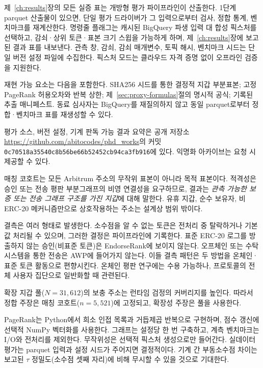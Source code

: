 
제~\ref{ch:results}장의 모든 실증 표는 개방형 평가 파이프라인이 산출한다. 1단계 parquet 산출물이 있으면, 단일 평가 드라이버가 그 입력으로부터 검사, 정합 통계, 벤치마크를 재계산한다. 명령줄 플래그는 캐시된 BigQuery 파생 입력 대 합성 픽스처를 선택하고, 감쇠·상위 토큰·표본 크기 스윕을 가능하게 하며, 제~\ref{ch:results}장에 보고된 결과 표를 내보낸다. 관측 창, 감쇠, 감쇠 매개변수, 토픽 해시, 벤치마크 시드는 단일 버전 설정 파일에 수집한다. 픽스처 모드는 클라우드 자격 증명 없이 오프라인 검증을 지원한다.

재현 가능 요소는 다음을 포함한다. SHA256 시드를 통한 결정적 지갑 부분표본; 고정 PageRank 허용오차와 반복 상한; 제~\ref{sec:proxy-formulas}절의 명시적 공식; 기록된 추출 매니페스트. 동료 심사자는 BigQuery를 재질의하지 않고 동일 parquet로부터 정합·벤치마크 표를 재생성할 수 있다.

평가 소스, 버전 설정, 기계 판독 가능 결과 요약은 공개 저장소 \url{https://github.com/abitocodes/phd_works}의 커밋 \texttt{0c70518a35540c8b56be66b52452cb94ca3fb916}에 있다. 익명화 아카이브는 요청 시 제공할 수 있다.


매칭 코호트는 모든 Arbitrum 주소의 무작위 표본이 아니라 목적 표본이다. 적격성은 승인 또는 전송 평판 부분그래프의 비영 연결성을 요구하므로, 결과는 \emph{관측 가능한 보증 또는 전송 그래프 구조를 가진 지갑}에 대해 말한다. 유휴 지갑, 순수 보유자, 비 ERC-20 메커니즘만으로 상호작용하는 주소는 설계상 범위 밖이다.

결측은 여러 형태로 발생한다. 소수점을 알 수 없는 토큰은 전처리 중 탈락하거나 기본값 처리될 수 있으며, 그러한 결정은 파이프라인에 기록한다. 표준 ERC-20 로그를 방출하지 않는 승인(비표준 토큰)은 EndorseRank에 보이지 않는다. 오프체인 또는 수탁 시스템을 통한 전송은 AWP에 들어가지 않는다. 이들 결측 패턴은 두 방법을 온체인·표준 토큰 활동으로 편향시킨다. 온체인 평판 연구에는 수용 가능하나, 프로토콜의 전체 사용자 집단으로 일반화할 때 관련된다.

확장 지갑 풀($N=31{,}612$)의 보충 주소는 런타임 검정의 커버리지를 높인다. 따라서 정합 주장은 매칭 코호트($n=5{,}521$)에 고정되고, 확장성 주장은 풀을 사용한다.


PageRank는 Python에서 희소 인접 목록과 거듭제곱 반복으로 구현하며, 점수 갱신에 선택적 NumPy 벡터화를 사용한다. 그래프는 설정당 한 번 구축하고, 계측 벤치마크는 I/O와 전처리를 제외한다. 무작위성은 선택적 픽스처 생성으로만 들어간다. 실데이터 평가는 parquet 입력과 설정 시드가 주어지면 결정적이다. 기계 간 부동소수점 차이는 보고된 $\tau$ 정밀도(소수점 셋째 자리)에 비해 무시할 수 있을 것으로 기대한다.

